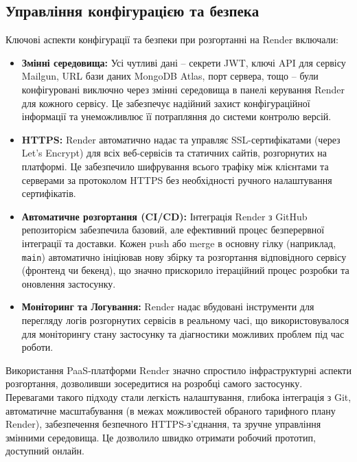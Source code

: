 \subsection{Управління конфігурацією та безпека}
Ключові аспекти конфігурації та безпеки при розгортанні на Render включали:
\begin{itemize}
    \item \textbf{Змінні середовища:} Усі чутливі дані – секрети JWT, ключі API для сервісу Mailgun, URL бази даних MongoDB Atlas, порт сервера, тощо – були конфігуровані виключно через змінні середовища в панелі керування Render для кожного сервісу. Це забезпечує надійний захист конфігураційної інформації та унеможливлює її потрапляння до системи контролю версій.
    \item \textbf{HTTPS:} Render автоматично надає та управляє SSL-сертифікатами (через Let's Encrypt) для всіх веб-сервісів та статичних сайтів, розгорнутих на платформі. Це забезпечило шифрування всього трафіку між клієнтами та серверами за протоколом HTTPS без необхідності ручного налаштування сертифікатів.
    \item \textbf{Автоматичне розгортання (CI/CD):} Інтеграція Render з GitHub репозиторієм забезпечила базовий, але ефективний процес безперервної інтеграції та доставки. Кожен push або merge в основну гілку (наприклад, \texttt{main}) автоматично ініціював нову збірку та розгортання відповідного сервісу (фронтенд чи бекенд), що значно прискорило ітераційний процес розробки та оновлення застосунку.
    \item \textbf{Моніторинг та Логування:} Render надає вбудовані інструменти для перегляду логів розгорнутих сервісів в реальному часі, що використовувалося для моніторингу стану застосунку та діагностики можливих проблем під час роботи.
\end{itemize}

Використання PaaS-платформи Render значно спростило інфраструктурні аспекти розгортання, дозволивши зосередитися на розробці самого застосунку. Перевагами такого підходу стали легкість налаштування, глибока інтеграція з Git, автоматичне масштабування (в межах можливостей обраного тарифного плану Render), забезпечення безпечного HTTPS-з'єднання, та зручне управління змінними середовища. Це дозволило швидко отримати робочий прототип, доступний онлайн.


